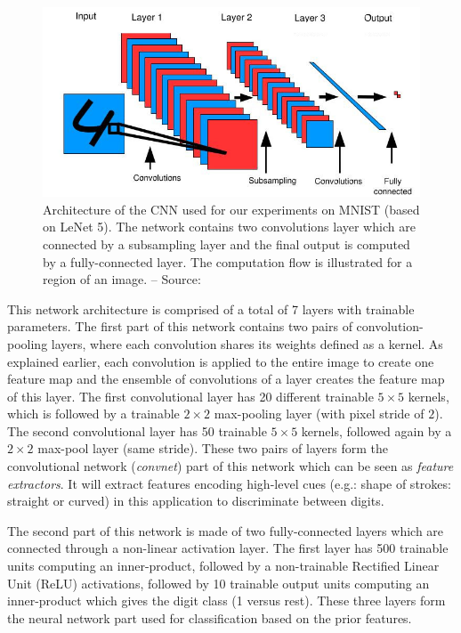 \documentclass[a4paper,12pt]{report}
\newcommand{\eg}{e.g.}
\begin{document}
\begin{figure}[t]
    \begin{center}
        \includegraphics{thesis_figures/siamese_cnn.jpg}
    \end{center}
    \caption{Architecture of the CNN used for our experiments on MNIST (based on LeNet 5). The network contains two convolutions layer which are connected by a subsampling layer and the final output is computed by a fully-connected layer. The computation flow is illustrated for a region of an image. -- Source: \cite{hadsell2006dimensionality}}
    \label{fig:siamese_cnn}
\end{figure}

This network architecture is comprised of a total of 7 layers with trainable parameters.
The first part of this network contains two pairs of convolution-pooling layers, where each convolution shares its weights defined as a kernel.
As explained earlier, each convolution is applied to the entire image to create one feature map and the ensemble of convolutions of a layer creates the feature map of this layer.
The first convolutional layer has 20 different trainable $5 \times 5$ kernels, which is followed by a trainable $2 \times 2$ max-pooling layer (with pixel stride of $2$).
The second convolutional layer has 50 trainable $5 \times 5$ kernels, followed again by a $2 \times 2$ max-pool layer (same stride).
These two pairs of layers form the convolutional network ({\em convnet}) part of this network which can be seen as {\em feature extractors}.
It will extract features encoding high-level cues (\eg: shape of strokes: straight or curved) in this application to discriminate between digits.

The second part of this network is made of two fully-connected layers which are connected through a non-linear activation layer.
The first layer has 500 trainable units computing an inner-product, followed by a non-trainable Rectified Linear Unit (ReLU) activations\cite{nair2010rectified}, followed by 10 trainable output units computing an inner-product which gives the digit class (1 versus rest).
These three layers form the neural network part used for classification based on the prior features.
\end{document}
